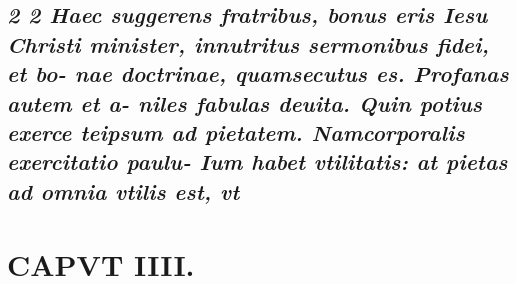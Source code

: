 \documentclass{article}
\begin{document}
\begin{pages}
\subsection*{\textit{2 2 Haec suggerens fratribus, bonus eris Iesu Christi minister, innutritus sermonibus fidei, et bo- nae doctrinae, quamsecutus es. Profanas autem et a- niles fabulas deuita. Quin potius exerce teipsum ad pietatem. Namcorporalis exercitatio paulu- Ium habet vtilitatis: at pietas ad omnia vtilis est, vt }}
\section*{CAPVT IIII. }
\marginpar{[ p.49 ]}
{}

\end{pages}
\end{document}
